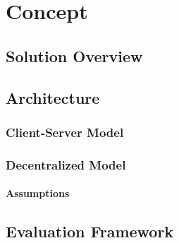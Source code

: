 
\chapter{Concept}

\section{Solution Overview}

\section{Architecture}
	\subsection{Client-Server Model}
	\subsection{Decentralized Model}
		\subsubsection{Assumptions}
		
\section{Evaluation Framework}